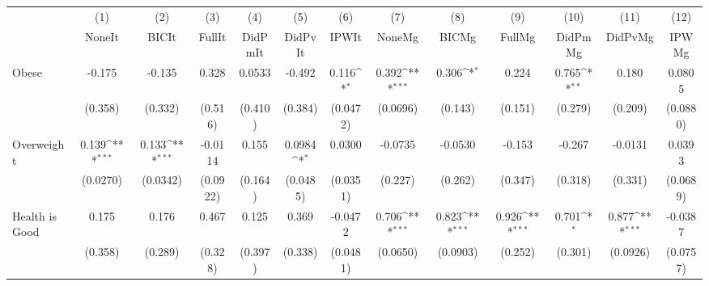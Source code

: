 {
\def\sym#1{\ifmmode^{#1}\else\(^{#1}\)\fi}
\begin{tabular}{l*{12}{c}}
\toprule
            &\multicolumn{1}{c}{(1)}&\multicolumn{1}{c}{(2)}&\multicolumn{1}{c}{(3)}&\multicolumn{1}{c}{(4)}&\multicolumn{1}{c}{(5)}&\multicolumn{1}{c}{(6)}&\multicolumn{1}{c}{(7)}&\multicolumn{1}{c}{(8)}&\multicolumn{1}{c}{(9)}&\multicolumn{1}{c}{(10)}&\multicolumn{1}{c}{(11)}&\multicolumn{1}{c}{(12)}\\
            &\multicolumn{1}{c}{NoneIt}&\multicolumn{1}{c}{BICIt}&\multicolumn{1}{c}{FullIt}&\multicolumn{1}{c}{DidPmIt}&\multicolumn{1}{c}{DidPvIt}&\multicolumn{1}{c}{IPWIt}&\multicolumn{1}{c}{NoneMg}&\multicolumn{1}{c}{BICMg}&\multicolumn{1}{c}{FullMg}&\multicolumn{1}{c}{DidPmMg}&\multicolumn{1}{c}{DidPvMg}&\multicolumn{1}{c}{IPWMg}\\
\midrule
Obese       &      -0.175         &      -0.135         &       0.328         &      0.0533         &      -0.492         &       0.116\sym{*}  &       0.392\sym{***}&       0.306\sym{*}  &       0.224         &       0.765\sym{**} &       0.180         &      0.0805         \\
            &     (0.358)         &     (0.332)         &     (0.516)         &     (0.410)         &     (0.384)         &    (0.0472)         &    (0.0696)         &     (0.143)         &     (0.151)         &     (0.279)         &     (0.209)         &    (0.0880)         \\
\addlinespace
Overweight  &       0.139\sym{***}&       0.133\sym{***}&     -0.0114         &       0.155         &      0.0984\sym{*}  &      0.0300         &     -0.0735         &     -0.0530         &      -0.153         &      -0.267         &     -0.0131         &      0.0393         \\
            &    (0.0270)         &    (0.0342)         &    (0.0922)         &     (0.164)         &    (0.0485)         &    (0.0351)         &     (0.227)         &     (0.262)         &     (0.347)         &     (0.318)         &     (0.331)         &    (0.0689)         \\
\addlinespace
Health is Good&       0.175         &       0.176         &       0.467         &       0.125         &       0.369         &     -0.0472         &       0.706\sym{***}&       0.823\sym{***}&       0.926\sym{***}&       0.701\sym{*}  &       0.877\sym{***}&     -0.0387         \\
            &     (0.358)         &     (0.289)         &     (0.328)         &     (0.397)         &     (0.338)         &    (0.0481)         &    (0.0650)         &    (0.0903)         &     (0.252)         &     (0.301)         &    (0.0926)         &    (0.0757)         \\

\end{tabular}}

